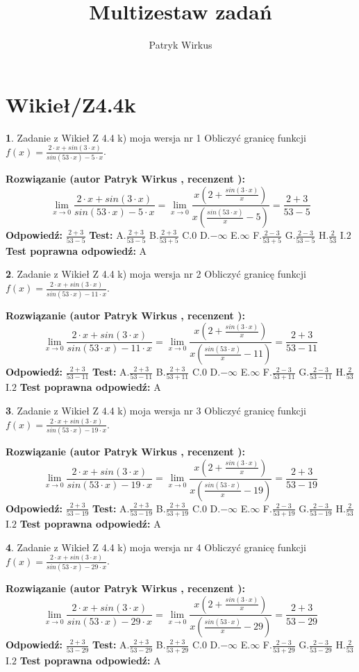 \documentclass[12pt, a4paper]{article}
\title{Multizestaw zadań}
\author{Patryk Wirkus}
\date{}
\theoremstyle{definition} %
\newtheorem{zad}{}
\newcommand{\kategoria}[1]{\section{#1}}
\newcommand{\zadStart}[1]{\begin{zad}#1\newline}
\newcommand{\zadStop}{\end{zad}}
\newcommand{\rozwStart}[2]{\noindent \textbf{Rozwiązanie (autor #1 , recenzent #2): }\newline}
\newcommand{\rozwStop}{\newline}
\newcommand{\odpStart}{\noindent \textbf{Odpowiedź:}\newline}
\newcommand{\odpStop}{\newline}
\newcommand{\testStart}{\noindent \textbf{Test:}\newline}
\newcommand{\testStop}{\newline}
\newcommand{\kluczStart}{\noindent \textbf{Test poprawna odpowiedź:}\newline}
\newcommand{\kluczStop}{\newline}
\begin{document}
\maketitle

\kategoria{Wikieł/Z4.4k}


\zadStart{Zadanie z Wikieł Z 4.4 k) moja wersja nr 1}
Obliczyć granicę funkcji $f(x)=\frac{2\cdot x +sin(3\cdot x)}{sin(53\cdot x) -5\cdot x}$.
\zadStop
\rozwStart{Patryk Wirkus}{}
$$\lim\limits_{x\to 0}\frac{2\cdot x +sin(3\cdot x)}{sin(53\cdot x) -5\cdot x}
=\lim\limits_{x\to 0}\frac{x(2+\frac{sin(3\cdot x)}{x})}{x(\frac{sin(53\cdot x)}{x}-5)}
=\frac{2+3}{53-5}$$
\rozwStop
\odpStart
$\frac{2+3}{53-5}$
\odpStop
\testStart
A.$\frac{2+3}{53-5}$
B.$\frac{2+3}{53+5}$
C.$0$
D.$-\infty$
E.$\infty$
F.$\frac{2-3}{53+5}$
G.$\frac{2-3}{53-5}$
H.$\frac{2}{53}$
I.$2$
\testStop
\kluczStart
A
\kluczStop



\zadStart{Zadanie z Wikieł Z 4.4 k) moja wersja nr 2}
Obliczyć granicę funkcji $f(x)=\frac{2\cdot x +sin(3\cdot x)}{sin(53\cdot x) -11\cdot x}$.
\zadStop
\rozwStart{Patryk Wirkus}{}
$$\lim\limits_{x\to 0}\frac{2\cdot x +sin(3\cdot x)}{sin(53\cdot x) -11\cdot x}
=\lim\limits_{x\to 0}\frac{x(2+\frac{sin(3\cdot x)}{x})}{x(\frac{sin(53\cdot x)}{x}-11)}
=\frac{2+3}{53-11}$$
\rozwStop
\odpStart
$\frac{2+3}{53-11}$
\odpStop
\testStart
A.$\frac{2+3}{53-11}$
B.$\frac{2+3}{53+11}$
C.$0$
D.$-\infty$
E.$\infty$
F.$\frac{2-3}{53+11}$
G.$\frac{2-3}{53-11}$
H.$\frac{2}{53}$
I.$2$
\testStop
\kluczStart
A
\kluczStop



\zadStart{Zadanie z Wikieł Z 4.4 k) moja wersja nr 3}
Obliczyć granicę funkcji $f(x)=\frac{2\cdot x +sin(3\cdot x)}{sin(53\cdot x) -19\cdot x}$.
\zadStop
\rozwStart{Patryk Wirkus}{}
$$\lim\limits_{x\to 0}\frac{2\cdot x +sin(3\cdot x)}{sin(53\cdot x) -19\cdot x}
=\lim\limits_{x\to 0}\frac{x(2+\frac{sin(3\cdot x)}{x})}{x(\frac{sin(53\cdot x)}{x}-19)}
=\frac{2+3}{53-19}$$
\rozwStop
\odpStart
$\frac{2+3}{53-19}$
\odpStop
\testStart
A.$\frac{2+3}{53-19}$
B.$\frac{2+3}{53+19}$
C.$0$
D.$-\infty$
E.$\infty$
F.$\frac{2-3}{53+19}$
G.$\frac{2-3}{53-19}$
H.$\frac{2}{53}$
I.$2$
\testStop
\kluczStart
A
\kluczStop



\zadStart{Zadanie z Wikieł Z 4.4 k) moja wersja nr 4}
Obliczyć granicę funkcji $f(x)=\frac{2\cdot x +sin(3\cdot x)}{sin(53\cdot x) -29\cdot x}$.
\zadStop
\rozwStart{Patryk Wirkus}{}
$$\lim\limits_{x\to 0}\frac{2\cdot x +sin(3\cdot x)}{sin(53\cdot x) -29\cdot x}
=\lim\limits_{x\to 0}\frac{x(2+\frac{sin(3\cdot x)}{x})}{x(\frac{sin(53\cdot x)}{x}-29)}
=\frac{2+3}{53-29}$$
\rozwStop
\odpStart
$\frac{2+3}{53-29}$
\odpStop
\testStart
A.$\frac{2+3}{53-29}$
B.$\frac{2+3}{53+29}$
C.$0$
D.$-\infty$
E.$\infty$
F.$\frac{2-3}{53+29}$
G.$\frac{2-3}{53-29}$
H.$\frac{2}{53}$
I.$2$
\testStop
\kluczStart
A
\kluczStop
\end{document}
